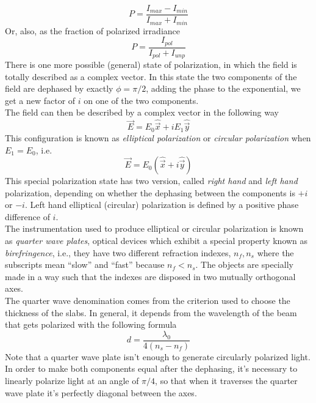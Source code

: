 \documentclass[../electromagnetism.tex]{subfiles}
\begin{document}
\begin{equation}
	P=\frac{I_{max}-I_{min}}{I_{max}+I_{min}}
	\label{eq:degpol.pol}
\end{equation}
Or, also, as the fraction of polarized irradiance
\begin{equation}
	P=\frac{I_{pol}}{I_{pol}+I_{unp}}
	\label{eq:degpol2.pol}
\end{equation}
There is one more possible (general) state of polarization, in which the field is totally described as a complex vector. In this state the two components of the field are dephased by exactly $\phi=\pi/2$, adding the phase to the exponential, we get a new factor of $i$ on one of the two components.\\
The field can then be described by a complex vector in the following way
\begin{equation}
	\vec{E}=E_0\hat{\vec{x}}+iE_1\hat{\vec{y}}
	\label{eq:elliptical.pol}
\end{equation}
This configuration is known as \textit{elliptical polarization} or \textit{circular polarization} when $E_1=E_0$, i.e.
\begin{equation}
	\vec{E}=E_0(\hat{\vec{x}}+i\hat{\vec{y}})
	\label{eq:circular.pol}
\end{equation}
This special polarization state has two version, called \textit{right hand} and \textit{left hand} polarization, depending on whether the dephasing between the components is $+i$ or $-i$. Left hand elliptical (circular) polarization is defined by a positive phase difference of $i$.\\
The instrumentation used to produce elliptical or circular polarization is known as \textit{quarter wave plates}, optical devices which exhibit a special property known as \textit{birefringence}, i.e., they have two different refraction indexes, $n_f, n_s$ where the subscripts mean ``slow'' and ``fast'' because $n_f<n_s$. The objects are specially made in a way such that the indexes are disposed in two mutually orthogonal axes.\\
The quarter wave denomination comes from the criterion used to choose the thickness of the slabs. In general, it depends from the wavelength of the beam that gets polarized with the following formula
\begin{equation}
	d=\frac{\lambda_0}{4(n_s-n_f)}
	\label{eq:qwp.pol}
\end{equation}
Note that a quarter wave plate isn't enough to generate circularly polarized light. In order to make both components equal after the dephasing, it's  necessary to linearly polarize light at an angle of $\pi/4$, so that when it traverses the quarter wave plate it's perfectly diagonal between the axes.
\end{document}
